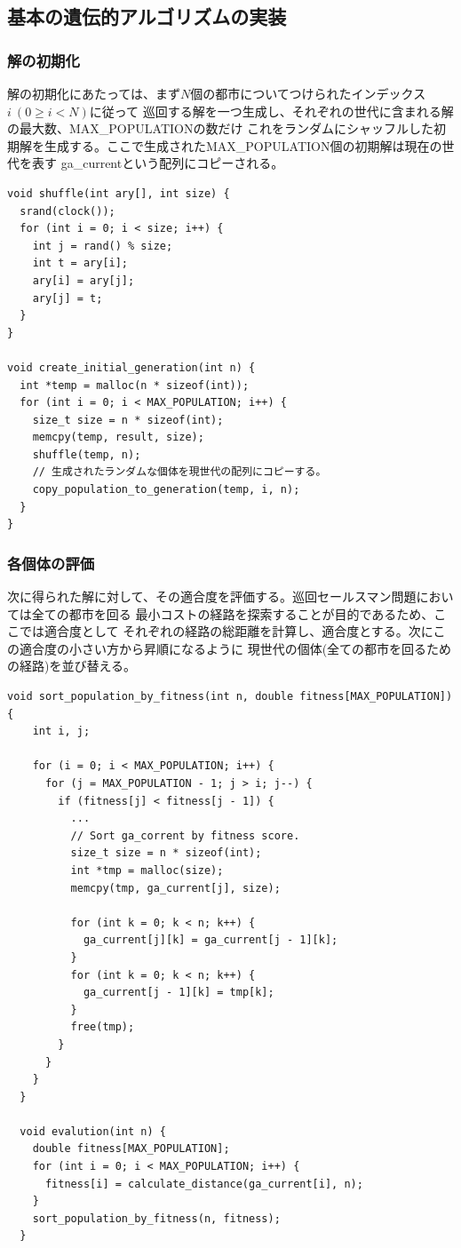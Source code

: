\documentclass[uplatex]{jsarticle}
\begin{document}
\subsection{基本の遺伝的アルゴリズムの実装}
\subsubsection{解の初期化}
解の初期化にあたっては、まず$N$個の都市についてつけられたインデックス$i\ (0 \geq i < N)$に従って
巡回する解を一つ生成し、それぞれの世代に含まれる解の最大数、MAX\_POPULATIONの数だけ
これをランダムにシャッフルした初期解を生成する。ここで生成されたMAX\_POPULATION個の初期解は現在の世代を表す
ga\_currentという配列にコピーされる。

\begin{lstlisting}[basicstyle=\ttfamily\footnotesize, frame=single]
void shuffle(int ary[], int size) {
  srand(clock());
  for (int i = 0; i < size; i++) {
    int j = rand() % size;
    int t = ary[i];
    ary[i] = ary[j];
    ary[j] = t;
  }
}

void create_initial_generation(int n) {
  int *temp = malloc(n * sizeof(int));
  for (int i = 0; i < MAX_POPULATION; i++) {
    size_t size = n * sizeof(int);
    memcpy(temp, result, size);
    shuffle(temp, n);
    // 生成されたランダムな個体を現世代の配列にコピーする。
    copy_population_to_generation(temp, i, n);
  }
}
\end{lstlisting}

\subsubsection{各個体の評価}
次に得られた解に対して、その適合度を評価する。巡回セールスマン問題においては全ての都市を回る
最小コストの経路を探索することが目的であるため、ここでは適合度として
それぞれの経路の総距離を計算し、適合度とする。次にこの適合度の小さい方から昇順になるように
現世代の個体(全ての都市を回るための経路)を並び替える。

\begin{lstlisting}[basicstyle=\ttfamily\footnotesize, frame=single]
  void sort_population_by_fitness(int n, double fitness[MAX_POPULATION]) {
    int i, j;

    for (i = 0; i < MAX_POPULATION; i++) {
      for (j = MAX_POPULATION - 1; j > i; j--) {
        if (fitness[j] < fitness[j - 1]) {
          ...
          // Sort ga_corrent by fitness score.
          size_t size = n * sizeof(int);
          int *tmp = malloc(size);
          memcpy(tmp, ga_current[j], size);

          for (int k = 0; k < n; k++) {
            ga_current[j][k] = ga_current[j - 1][k];
          }
          for (int k = 0; k < n; k++) {
            ga_current[j - 1][k] = tmp[k];
          }
          free(tmp);
        }
      }
    }
  }

  void evalution(int n) {
    double fitness[MAX_POPULATION];
    for (int i = 0; i < MAX_POPULATION; i++) {
      fitness[i] = calculate_distance(ga_current[i], n);
    }
    sort_population_by_fitness(n, fitness);
  }
\end{lstlisting}
\end{document}
